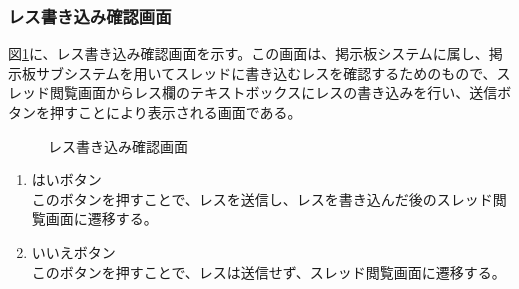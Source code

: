 \documentclass[a4j]{jarticle}
\begin{document}
\subsubsection{レス書き込み確認画面}
図\ref{fig:check_res}に、レス書き込み確認画面を示す。この画面は、掲示板システムに属し、掲示板サブシステムを用いてスレッドに書き込むレスを確認するためのもので、スレッド閲覧画面からレス欄のテキストボックスにレスの書き込みを行い、送信ボタンを押すことにより表示される画面である。

\begin{figure}[H]
\centering
{}
\caption{レス書き込み確認画面}
\label{fig:check_res}
\end{figure}

\begin{enumerate}
  \renewcommand{\labelenumi}{\textcircled{\scriptsize \theenumi}}
\item はいボタン\\
  このボタンを押すことで、レスを送信し、レスを書き込んだ後のスレッド閲覧画面に遷移する。
\item いいえボタン\\
  このボタンを押すことで、レスは送信せず、スレッド閲覧画面に遷移する。
\end{enumerate}
\end{document}
